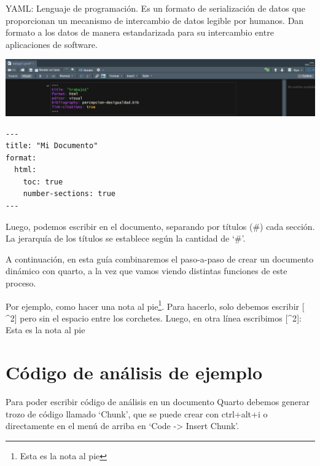 \documentclass[
  letterpaper,
  DIV=11,
  numbers=noendperiod]{scrartcl}
\begin{document}
\begin{tcolorbox}[enhanced jigsaw, opacitybacktitle=0.6, colframe=quarto-callout-note-color-frame, breakable, toprule=.15mm, bottomrule=.15mm, toptitle=1mm, colback=white, bottomtitle=1mm, rightrule=.15mm, title=\textcolor{quarto-callout-note-color}{\faInfo}\hspace{0.5em}{Note}, leftrule=.75mm, coltitle=black, opacityback=0, titlerule=0mm, arc=.35mm, left=2mm, colbacktitle=quarto-callout-note-color!10!white]

YAML: Lenguaje de programación. Es un formato de serialización de datos
que proporcionan un mecanismo de intercambio de datos legible por
humanos. Dan formato a los datos de manera estandarizada para su
intercambio entre aplicaciones de software.

\includegraphics{images/yaml.png}

\end{tcolorbox}

\begin{verbatim}
---
title: "Mi Documento"
format:
  html:
    toc: true
    number-sections: true
---
\end{verbatim}

Luego, podemos escribir en el documento, separando por títulos (\#) cada
sección. La jerarquía de los títulos se establece según la cantidad de
`\#'.

A continuación, en esta guía combinaremos el paso-a-paso de crear un
documento dinámico con quarto, a la vez que vamos viendo distintas
funciones de este proceso.

Por ejemplo, como hacer una nota al pie\footnote{Esta es la nota al pie}.
Para hacerlo, solo debemos escribir {[} \^{}2{]} pero sin el espacio
entre los corchetes. Luego, en otra línea escribimos {[}\^{}2{]}: Esta
es la nota al pie

\section{Código de análisis de
ejemplo}\label{cuxf3digo-de-anuxe1lisis-de-ejemplo}

Para poder escribir código de análisis en un documento Quarto debemos
generar trozo de código llamado `Chunk', que se puede crear con
ctrl+alt+i o directamente en el menú de arriba en `Code -\textgreater{}
Insert Chunk'.
\end{document}
